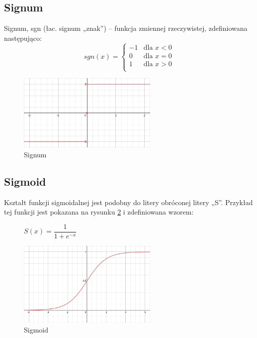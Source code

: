 \documentclass{article}
\begin{document}
\subsection{Signum}
Signum, sgn (łac. signum „znak”) – funkcja zmiennej rzeczywistej, zdefiniowana następująco:
\begin{equation}
	sgn(x) = 
	\begin{cases}
		-1 & \text{dla $x < 0$}\\
		0 & \text{dla $x = 0$}\\
		1 & \text{dla $x > 0$}\\
	\end{cases}    
\end{equation}

\begin{figure}[H]
	\centering
	\includegraphics[width=0.6\textwidth,keepaspectratio=true]{Signum}
	\caption{
		Signum
	}
	\label{Signum}
\end{figure}


\subsection{Sigmoid}
Kształt funkcji sigmoidalnej jest podobny do litery obróconej litery „S”.
Przykład tej funkcji jest pokazana na rysunku \ref{Sigmoid} i zdefiniowana wzorem: 


\begin{figure}[H]
	\begin{center}
		$S(x) = \dfrac{1}{1 + e^{-x}}$
	\end{center}
	
	\centering
	\includegraphics[width=0.6\textwidth,keepaspectratio=true]{Sigmoid}
	\caption{
		Sigmoid
	}
	\label{Sigmoid}
\end{figure}
\end{document}
